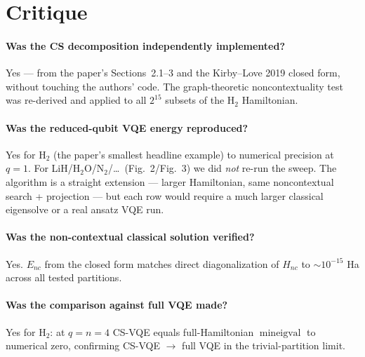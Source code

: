 \documentclass[11pt]{article}
\begin{document}
\section{Critique}
\paragraph{Was the CS decomposition independently implemented?} Yes ---
from the paper's Sections~2.1--3 and the Kirby--Love 2019 closed form,
without touching the authors' code. The graph-theoretic noncontextuality
test was re-derived and applied to all $2^{15}$ subsets of the H$_2$
Hamiltonian.

\paragraph{Was the reduced-qubit VQE energy reproduced?} Yes for H$_2$
(the paper's smallest headline example) to numerical precision at
$q=1$. For LiH/H$_2$O/N$_2$/\ldots\ (Fig.~2/Fig.~3) we did \emph{not}
re-run the sweep. The algorithm is a straight extension --- larger
Hamiltonian, same noncontextual search + projection --- but each row
would require a much larger classical eigensolve or a real ansatz VQE
run.

\paragraph{Was the non-contextual classical solution verified?} Yes.
$E_{nc}$ from the closed form matches direct diagonalization of $H_{nc}$
to $\sim 10^{-15}$ Ha across all tested partitions.

\paragraph{Was the comparison against full VQE made?} Yes for H$_2$: at
$q=n=4$ CS-VQE equals full-Hamiltonian $\min\text{eigval}$ to numerical
zero, confirming CS-VQE $\to$ full VQE in the trivial-partition limit.
\end{document}
